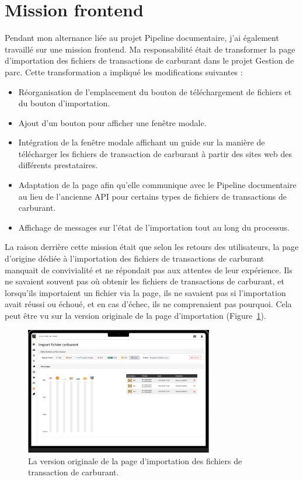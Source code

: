 \section{Mission frontend}

Pendant mon alternance liée au projet Pipeline documentaire, j'ai également travaillé sur une mission frontend. Ma responsabilité était de transformer la page d'importation des fichiers de transactions de carburant dans le projet Gestion de parc. Cette transformation a impliqué les modifications suivantes :

\begin{itemize}
    \item Réorganisation de l'emplacement du bouton de téléchargement de fichiers et du bouton d'importation.
    \item Ajout d'un bouton pour afficher une fenêtre modale.
    \item Intégration de la fenêtre modale affichant un guide sur la manière de télécharger les fichiers de transaction de carburant à partir des sites web des différents prestataires.
    \item Adaptation de la page afin qu'elle communique avec le Pipeline documentaire au lieu de l'ancienne API pour certains types de fichiers de transactions de carburant.
    \item Affichage de messages sur l'état de l'importation tout au long du processus.
\end{itemize}

La raison derrière cette mission était que selon les retours des utilisateurs, la page d'origine dédiée à l'importation des fichiers de transactions de carburant manquait de convivialité et ne répondait pas aux attentes de leur expérience. Ils ne savaient souvent pas où obtenir les fichiers de transactions de carburant, et lorsqu'ils importaient un fichier via la page, ils ne savaient pas si l'importation avait réussi ou échoué, et en cas d'échec, ils ne comprenaient pas pourquoi. Cela peut être vu sur la version originale de la page d'importation (Figure~\ref{fig:original-import-page}).

\begin{figure}[ht]
    \centering
    \includegraphics[width=0.73\textwidth]{img/frontend-maquettage-original}
    \caption{La version originale de la page d'importation des fichiers de transaction de carburant.}
    \label{fig:original-import-page}
\end{figure}

